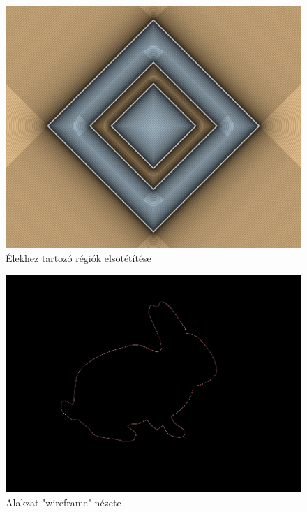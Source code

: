 \begin{figure}[H]
    \centering
    \includegraphics[width=0.85\linewidth]{images/darken_segment_regions.png}
    \caption{Élekhez tartozó régiók elsötétítése}
    \label{fig:darken_segment_regions-1}
\end{figure}

\begin{figure}[H]
    \centering
    \includegraphics[width=0.85\linewidth]{images/outline_only.png}
    \caption{Alakzat "wireframe" nézete}
    \label{fig:outline_only-1}
\end{figure}

